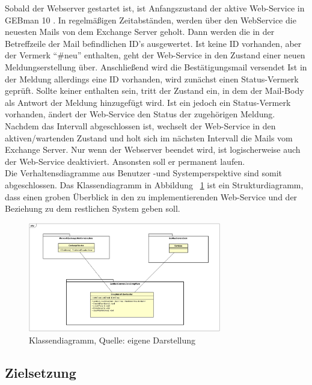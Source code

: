 \noindent
Sobald der Webserver gestartet ist, ist Anfangszustand der aktive Web-Service in GEBman 10 . In regelmäßigen Zeitabständen, werden über den WebService die neuesten Mails von dem Exchange Server geholt. Dann werden die in der Betreffzeile der Mail befindlichen ID's ausgewertet. Ist keine ID vorhanden, aber der Vermerk \enquote{\#neu} enthalten, geht der Web-Service in den Zustand einer neuen Meldungserstellung über. Anschließend wird die Bestätigungsmail versendet\newline
Ist in der Meldung allerdings eine ID vorhanden, wird zunächst einen Status-Vermerk geprüft. Sollte keiner enthalten sein, tritt der Zustand ein, in dem der Mail-Body als Antwort der Meldung hinzugefügt wird. Ist ein jedoch ein Status-Vermerk vorhanden, ändert der Web-Service den Status der zugehörigen Meldung.\newline
Nachdem das Intervall abgeschlossen ist, wechselt der Web-Service in den aktiven/wartenden Zustand und holt sich im nächsten Intervall die Mails vom Exchange Server. Nur wenn der Webserver beendet wird, ist logischerweise auch der Web-Service deaktiviert. Ansonsten soll er permanent laufen.\\

\noindent
Die Verhaltensdiagramme aus Benutzer -und Systemperspektive sind somit abgeschlossen. Das Klassendiagramm in Abbildung ~\ref{fig:Klassendiagramm} ist ein Strukturdiagramm, dass einen groben Überblick in den zu implementierenden Web-Service und der Beziehung zu dem restlichen System geben soll.




\begin{figure}[h!]
\centering
\includegraphics[width=0.75\textwidth]{Abbildungen/Klassendiagramm.png}
	\caption[Klassendiagramm]{Klassendiagramm, Quelle: eigene Darstellung}
	\label{fig:Klassendiagramm}
\end{figure}




\subsection{Zielsetzung}
